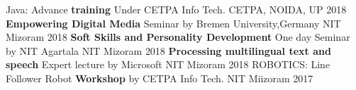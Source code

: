 \begin{cvhonors}
     \cvhonor
    {Java: Advance}
    {\textbf{training} Under CETPA Info Tech.}
    {CETPA, NOIDA, UP}
    {2018}
    \cvhonor
    {\textbf{Empowering Digital Media}}
    {Seminar by Bremen University,Germany}
    {NIT Mizoram}
    {2018}
    \cvhonor
    {\textbf{Soft Skills and Personality Development}}
    {One day Seminar by NIT Agartala}
    {NIT Mizoram}
    {2018}
    \cvhonor
    {\textbf{Processing multilingual text and speech}}
    {Expert lecture by Microsoft}
    {NIT Mizoram}
    {2018}
    \cvhonor
    {ROBOTICS: Line Follower Robot}
    {\textbf{Workshop} by CETPA Info Tech.}
    {NIT Miizoram}
    {2017}
\end{cvhonors}